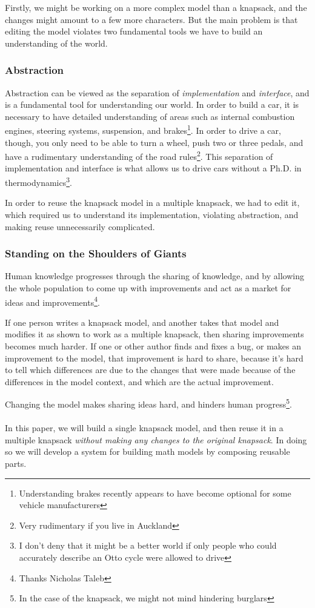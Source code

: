 \documentclass[a4paper,12pt]{article}
\begin{document}
Firstly, we might be working on a more complex model than a knapsack,
and the changes might amount to a few more characters.
But the main problem is that editing the model violates two fundamental tools we have to build an understanding of the world.

\subsubsection{Abstraction}
Abstraction can be viewed as the separation of \emph{implementation} and \emph{interface},
and is a fundamental tool for understanding our world.
In order to build a car,
it is necessary to have detailed understanding of areas such as internal combustion engines, steering systems,
suspension, and brakes\footnote{Understanding brakes recently appears to have become optional for some vehicle manufacturers}.
In order to drive a car, though, you only need to be able to turn a wheel, push two or three pedals, and have a rudimentary understanding of the road rules\footnote{Very rudimentary if you live in Auckland}.
This separation of implementation and interface is what allows us to drive cars without a Ph.D. in thermodynamics\footnote{I don't deny that it might be a better world if only people who could accurately describe an Otto cycle were allowed to drive}.

In order to reuse the knapsack model in a multiple knapsack, we had to edit it,
which required us to understand its implementation, violating abstraction,
and making reuse unnecessarily complicated.


\subsubsection{Standing on the Shoulders of Giants}
Human knowledge progresses through the sharing of knowledge,
and by allowing the whole population to come up with improvements and act as a market for ideas and improvements\footnote{Thanks Nicholas Taleb}.

If one person writes a knapsack model,
and another takes that model and modifies it as shown to work as a multiple knapsack,
then sharing improvements becomes much harder.
If one or other author finds and fixes a bug, or makes an improvement to the model,
that improvement is hard to share,
because it's hard to tell which differences are due to the changes that were made because of the differences in the model context, and which are the actual improvement.

Changing the model makes sharing ideas hard, and hinders human progress\footnote{In the case of the knapsack, we might not mind hindering burglars}.
\\
\\
In this paper, we will build a single knapsack model, and then reuse it in a multiple knapsack
\emph{without making any changes to the original knapsack}.
In doing so we will develop a system for building math models by composing reusable parts.
\end{document}
